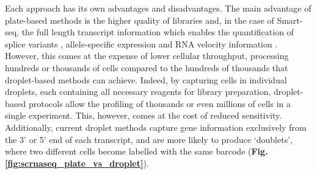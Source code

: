 Each approach has its own advantages and disadvantages.
The main advantage of plate-based methods is the higher quality of libraries and, in the case of Smart-seq, the full length transcript information which enables the quantification of splice variants \cite{westoby2018simulation}, allele-specific expression \cite{jiang2017scale} and RNA velocity information \cite{la2018rna}. 
However, this comes at the expense of lower cellular throughput, processing hundreds or thousands of cells compared to the hundreds of thousands that droplet-based methods can achieve.
Indeed, by capturing cells in individual droplets, 
each containing all necessary reagents for library preparation, 
droplet-based protocols allow the profiling of thousands or even millions of cells in a single experiment. 
This, however, comes at the cost of reduced sensitivity.
Additionally, current droplet methods capture gene information exclusively from the 3’ or 5’ end of each transcript, and are more likely to produce `doublets', where two different cells become labelled with the same barcode (\textbf{Fig. \ref{fig:scrnaseq_plate_vs_droplet}}). 
\\

